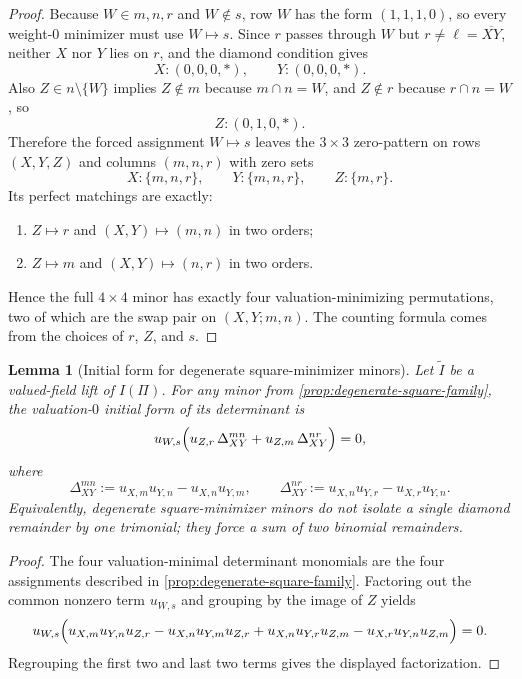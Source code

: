 \documentclass[11pt]{amsart}
\numberwithin{equation}{section}
\theoremstyle{plain}
\newtheorem{lemma}[theorem]{Lemma}
\theoremstyle{definition}
\theoremstyle{remark}
\begin{document}
\begin{proof}
Because $W\in m,n,r$ and $W\notin s$, row $W$ has the form $(1,1,1,0)$, so every weight-$0$ minimizer must use $W\mapsto s$. Since
$r$ passes through $W$ but $r\neq \ell=\overline{XY}$, neither $X$ nor $Y$ lies on $r$, and the diamond condition gives
\[
X:(0,0,0,*),\qquad Y:(0,0,0,*).
\]
Also $Z\in n\setminus\{W\}$ implies $Z\notin m$ because $m\cap n=W$, and $Z\notin r$ because $r\cap n=W$, so
\[
Z:(0,1,0,*).
\]
Therefore the forced assignment $W\mapsto s$ leaves the $3\times3$ zero-pattern on rows $(X,Y,Z)$ and columns $(m,n,r)$ with zero sets
\[
X:\{m,n,r\},\qquad Y:\{m,n,r\},\qquad Z:\{m,r\}.
\]
Its perfect matchings are exactly:
\begin{enumerate}[leftmargin=2em,label=(\roman*)]
  \item $Z\mapsto r$ and $(X,Y)\mapsto(m,n)$ in two orders;
  \item $Z\mapsto m$ and $(X,Y)\mapsto(n,r)$ in two orders.
\end{enumerate}
Hence the full $4\times4$ minor has exactly four valuation-minimizing permutations, two of which are the swap pair on $(X,Y;m,n)$.
The counting formula comes from the choices of $r$, $Z$, and $s$.
\end{proof}

\begin{lemma}[Initial form for degenerate square-minimizer minors]
\label{lem:degenerate-square-initial-form}
Let $\widetilde I$ be a valued-field lift of $I(\Pi)$. For any minor from \cref{prop:degenerate-square-family}, the valuation-$0$ initial
form of its determinant is
\[
u_{W,s}
\Bigl(
 u_{Z,r}\,\Delta_{XY}^{mn}
+
 u_{Z,m}\,\Delta_{XY}^{nr}
\Bigr)=0,
\]
where
\[
\Delta_{XY}^{mn}:=u_{X,m}u_{Y,n}-u_{X,n}u_{Y,m},
\qquad
\Delta_{XY}^{nr}:=u_{X,n}u_{Y,r}-u_{X,r}u_{Y,n}.
\]
Equivalently, degenerate square-minimizer minors do not isolate a single diamond remainder by one trimonial; they force a sum of two binomial remainders.
\end{lemma}

\begin{proof}
The four valuation-minimal determinant monomials are the four assignments described in \cref{prop:degenerate-square-family}. Factoring
out the common nonzero term $u_{W,s}$ and grouping by the image of $Z$ yields
\[
u_{W,s}
\Bigl(
 u_{X,m}u_{Y,n}u_{Z,r}
-
 u_{X,n}u_{Y,m}u_{Z,r}
+
 u_{X,n}u_{Y,r}u_{Z,m}
-
 u_{X,r}u_{Y,n}u_{Z,m}
\Bigr)=0.
\]
Regrouping the first two and last two terms gives the displayed factorization.
\end{proof}
\end{document}
